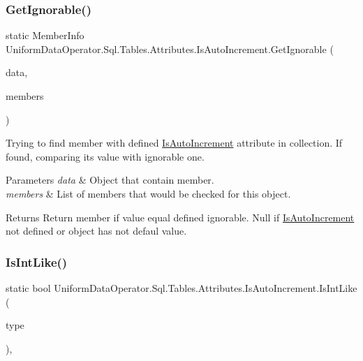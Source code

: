 \subsubsection{\texorpdfstring{Get\+Ignorable()}{GetIgnorable()}\hspace{0.1cm}{\footnotesize\ttfamily [2/2]}}
{\footnotesize\ttfamily static Member\+Info Uniform\+Data\+Operator.\+Sql.\+Tables.\+Attributes.\+Is\+Auto\+Increment.\+Get\+Ignorable (\begin{DoxyParamCaption}\item[{ref object}]{data,  }\item[{I\+Enumerable$<$ Member\+Info $>$}]{members }\end{DoxyParamCaption})\hspace{0.3cm}{\ttfamily [static]}}



Trying to find member with defined \mbox{\hyperlink{class_uniform_data_operator_1_1_sql_1_1_tables_1_1_attributes_1_1_is_auto_increment}{Is\+Auto\+Increment}} attribute in collection. If found, comparing it\textquotesingle{}s value with ignorable one. 


\begin{DoxyParams}{Parameters}
{\em data} & Object that contain member.\\
\hline
{\em members} & List of members that would be checked for this object.\\
\hline
\end{DoxyParams}
\begin{DoxyReturn}{Returns}
Return member if value equal defined ignorable. Null if \mbox{\hyperlink{class_uniform_data_operator_1_1_sql_1_1_tables_1_1_attributes_1_1_is_auto_increment}{Is\+Auto\+Increment}} not defined or object has not defaul value.
\end{DoxyReturn}
\mbox{\label{class_uniform_data_operator_1_1_sql_1_1_tables_1_1_attributes_1_1_is_auto_increment_a23347282e6b351289251b4cbfd438f51}} 
\subsubsection{\texorpdfstring{Is\+Int\+Like()}{IsIntLike()}}
{\footnotesize\ttfamily static bool Uniform\+Data\+Operator.\+Sql.\+Tables.\+Attributes.\+Is\+Auto\+Increment.\+Is\+Int\+Like (\begin{DoxyParamCaption}\item[{Type}]{type }\end{DoxyParamCaption})\hspace{0.3cm}{\ttfamily [static]}, {\ttfamily [protected]}}




